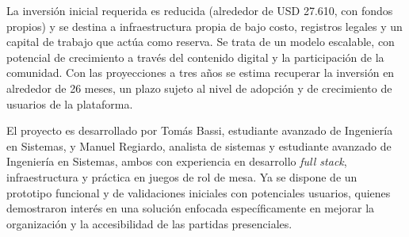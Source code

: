 La inversión inicial requerida es reducida (alrededor de USD 27.610, con fondos propios) y se destina a infraestructura propia de bajo costo, registros legales y un capital de trabajo que actúa como reserva. Se trata de un modelo escalable, con potencial de crecimiento a través del contenido digital y la participación de la comunidad. Con las proyecciones a tres años se estima recuperar la inversión en alrededor de 26 meses, un plazo sujeto al nivel de adopción y de crecimiento de usuarios de la plataforma.

El proyecto es desarrollado por Tomás Bassi, estudiante avanzado de Ingeniería en Sistemas, y Manuel Regiardo, analista de sistemas y estudiante avanzado de Ingeniería en Sistemas, ambos con experiencia en desarrollo \textit{full stack}, infraestructura y práctica en juegos de rol de mesa. Ya se dispone de un prototipo funcional y de validaciones iniciales con potenciales usuarios, quienes demostraron interés en una solución enfocada específicamente en mejorar la organización y la accesibilidad de las partidas presenciales.
